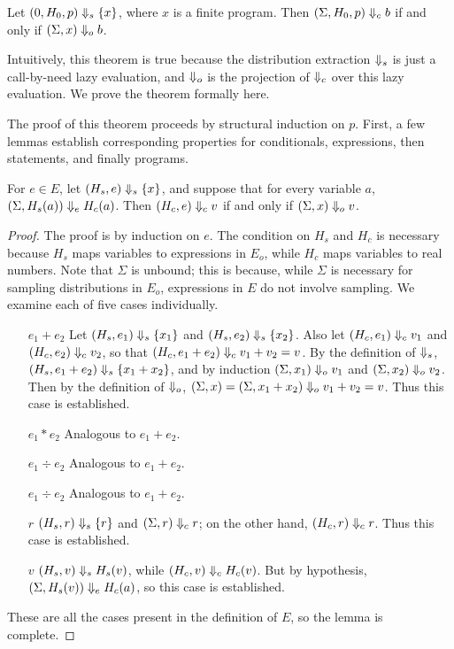 \begin{theorem} \label{thm:main}
Let $(0, H_0, p) \Downarrow_s \{ x \}$, where $x$ is a finite program.
Then $(\Sigma, H_0, p) \Downarrow_c b$ if and only if $(\Sigma, x) \Downarrow_o b$.
\end{theorem}

Intuitively, this theorem is true because the distribution extraction
$\Downarrow_s$ is just a call-by-need lazy evaluation, and $\Downarrow_o$ is
the projection of $\Downarrow_c$ over this lazy evaluation.  We prove the
theorem formally here.

The proof of this theorem proceeds by structural induction on $p$.
First, a few lemmas establish corresponding properties for
conditionals, expressions, then statements, and finally programs.

\begin{lemma} \label{lem:expr}
  For $e \in E$, let $(H_s, e) \Downarrow_s \{ x \}$, and suppose that for
  every variable $a$, $(\Sigma, H_s(a)) \Downarrow_e H_c(a)$.  Then $(H_c,
  e) \Downarrow_c v$ if and only if $(\Sigma, x) \Downarrow_o v$.
\end{lemma}

\begin{proof}
The proof is by induction on $e$.  The condition on $H_s$ and $H_c$ is
necessary because $H_s$ maps variables to expressions in $E_o$, while
$H_c$ maps variables to real numbers.  Note that $\Sigma$ is unbound;
this is because, while $\Sigma$ is necessary for sampling
distributions in $E_o$, expressions in $E$ do not involve sampling.
We examine each of five cases individually.

\begin{itemize}
\item[$e_1 + e_2$] Let $(H_s, e_1) \Downarrow_s \{ x_1 \}$ and $(H_s, e_2)
  \Downarrow_s \{ x_2 \}$. Also let $(H_c, e_1) \Downarrow_c v_1$ and $(H_c,
  e_2) \Downarrow_c v_2$, so that $(H_c, e_1 + e_2) \Downarrow_c v_1 + v_2 =
  v$.  By the definition of $\Downarrow_s$, $(H_s, e_1 + e_2) \Downarrow_s \{
  x_1 + x_2 \}$, and by induction $(\Sigma, x_1) \Downarrow_o v_1$ and
  $(\Sigma, x_2) \Downarrow_o v_2$.  Then by the definition of $\Downarrow_o$,
  $(\Sigma, x) = (\Sigma, x_1 + x_2) \Downarrow_o v_1 + v_2 = v$.  Thus
  this case is established.
\item[$e_1 * e_2$] Analogous to $e_1 + e_2$.
\item[$e_1 \div e_2$] Analogous to $e_1 + e_2$.
\item[$e_1 \div e_2$] Analogous to $e_1 + e_2$.
\item[$r$] $(H_s, r) \Downarrow_s \{ r \}$ and $(\Sigma, r) \Downarrow_c r$;
  on the other hand, $(H_c, r) \Downarrow_c r$.  Thus this case is
  established.
\item[$v$] $(H_s, v) \Downarrow_s H_s(v)$, while $(H_c, v) \Downarrow_c
  H_c(v)$.  But by hypothesis, $(\Sigma, H_s(v)) \Downarrow_e H_c(a)$, so
  this case is established.
\end{itemize}

These are all the cases present in the definition of $E$, so the lemma
is complete.

\end{proof}

